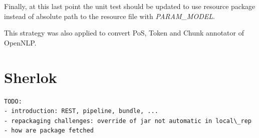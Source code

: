 \documentclass{article}
\newcommand{\id}[1]{\mbox{\textit{#1}}}
\begin{document}
Finally, at this last point the unit test should be updated to use resource package instead of absolute path to the resource file with \id{PARAM\_MODEL}.

This strategy was also applied to convert PoS, Token and Chunk annotator of OpenNLP.


\section{Sherlok}

\begin{verbatim}
TODO:
- introduction: REST, pipeline, bundle, ...
- repackaging challenges: override of jar not automatic in local\_rep
- how are package fetched
\end{verbatim}

\end{document}
